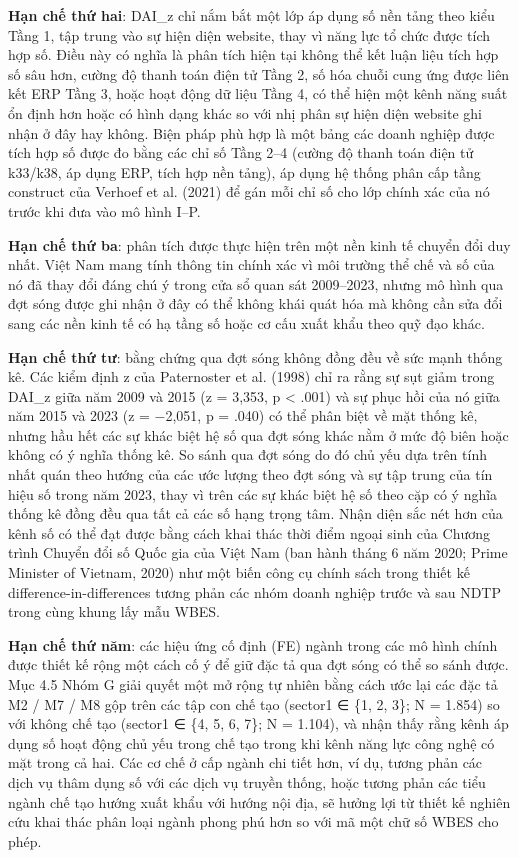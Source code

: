 \documentclass[12pt,a4paper]{article}
\begin{document}
\textbf{Hạn chế thứ hai}: DAI\_z chỉ nắm bắt một lớp áp dụng số nền tảng
theo kiểu Tầng 1, tập trung vào sự hiện diện website, thay vì năng lực
tổ chức được tích hợp số. Điều này có nghĩa là phân tích hiện tại không
thể kết luận liệu tích hợp số sâu hơn, cường độ thanh toán điện tử Tầng
2, số hóa chuỗi cung ứng được liên kết ERP Tầng 3, hoặc hoạt động dữ
liệu Tầng 4, có thể hiện một kênh năng suất ổn định hơn hoặc có hình
dạng khác so với nhị phân sự hiện diện website ghi nhận ở đây hay không.
Biện pháp phù hợp là một bảng các doanh nghiệp được tích hợp số được đo
bằng các chỉ số Tầng 2--4 (cường độ thanh toán điện tử k33/k38, áp dụng
ERP, tích hợp nền tảng), áp dụng hệ thống phân cấp tầng construct của
Verhoef et al. (2021) để gán mỗi chỉ số cho lớp chính xác của nó trước
khi đưa vào mô hình I--P.

\textbf{Hạn chế thứ ba}: phân tích được thực hiện trên một nền kinh tế
chuyển đổi duy nhất. Việt Nam mang tính thông tin chính xác vì môi
trường thể chế và số của nó đã thay đổi đáng chú ý trong cửa sổ quan sát
2009--2023, nhưng mô hình qua đợt sóng được ghi nhận ở đây có thể không
khái quát hóa mà không cần sửa đổi sang các nền kinh tế có hạ tầng số
hoặc cơ cấu xuất khẩu theo quỹ đạo khác.

\textbf{Hạn chế thứ tư}: bằng chứng qua đợt sóng không đồng đều về sức
mạnh thống kê. Các kiểm định z của Paternoster et al. (1998) chỉ ra rằng
sự sụt giảm trong DAI\_z giữa năm 2009 và 2015 (z = 3,353, p \textless{}
.001) và sự phục hồi của nó giữa năm 2015 và 2023 (z = −2,051, p = .040)
có thể phân biệt về mặt thống kê, nhưng hầu hết các sự khác biệt hệ số
qua đợt sóng khác nằm ở mức độ biên hoặc không có ý nghĩa thống kê. So
sánh qua đợt sóng do đó chủ yếu dựa trên tính nhất quán theo hướng của
các ước lượng theo đợt sóng và sự tập trung của tín hiệu số trong năm
2023, thay vì trên các sự khác biệt hệ số theo cặp có ý nghĩa thống kê
đồng đều qua tất cả các số hạng trọng tâm. Nhận diện sắc nét hơn của
kênh số có thể đạt được bằng cách khai thác thời điểm ngoại sinh của
Chương trình Chuyển đổi số Quốc gia của Việt Nam (ban hành tháng 6 năm
2020; Prime Minister of Vietnam, 2020) như một biến công cụ chính sách
trong thiết kế difference-in-differences tương phản các nhóm doanh
nghiệp trước và sau NDTP trong cùng khung lấy mẫu WBES.

\textbf{Hạn chế thứ năm}: các hiệu ứng cố định (FE) ngành trong các mô
hình chính được thiết kế rộng một cách cố ý để giữ đặc tả qua đợt sóng
có thể so sánh được. Mục 4.5 Nhóm G giải quyết một mở rộng tự nhiên bằng
cách ước lại các đặc tả M2 / M7 / M8 gộp trên các tập con chế tạo
(sector1 ∈ \{1, 2, 3\}; N = 1.854) so với không chế tạo (sector1 ∈ \{4,
5, 6, 7\}; N = 1.104), và nhận thấy rằng kênh áp dụng số hoạt động chủ
yếu trong chế tạo trong khi kênh năng lực công nghệ có mặt trong cả hai.
Các cơ chế ở cấp ngành chi tiết hơn, ví dụ, tương phản các dịch vụ thâm
dụng số với các dịch vụ truyền thống, hoặc tương phản các tiểu ngành chế
tạo hướng xuất khẩu với hướng nội địa, sẽ hưởng lợi từ thiết kế nghiên
cứu khai thác phân loại ngành phong phú hơn so với mã một chữ số WBES
cho phép.
\end{document}
